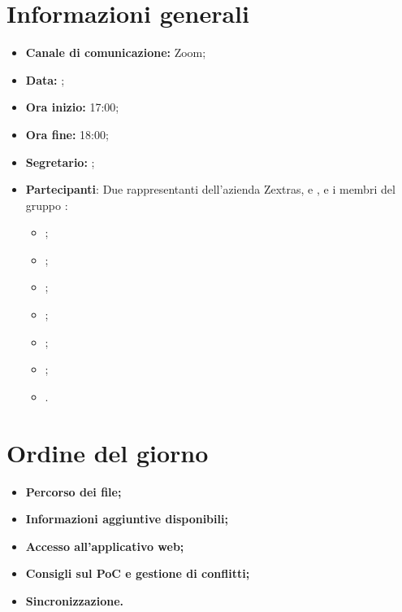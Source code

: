 \section{Informazioni generali}

\begin{itemize}

    \item \textbf{Canale di comunicazione:} Zoom;

    \item \textbf{Data:} \DataMeeting{};
    
    \item \textbf{Ora inizio:} 17:00;

    \item \textbf{Ora fine:} 18:00;

    \item \textbf{Segretario:} \ACapoRedazione{};

    \item \textbf{Partecipanti}: Due rappresentanti dell'azienda Zextras, \Alessio{} e \Federico{}, e i membri del gruppo \Gruppo{}:
    
        \begin{itemize}
            \item \Daniele{};
            \item \Davide{};
            \item \Francesco{};
            \item \Giosue{};
            \item \Lucrezia{};
            \item \Matteo{};
             \item \Tommaso{}.
        \end{itemize}
\end{itemize}

\section{Ordine del giorno}

\begin{itemize}
    \item\textbf{Percorso dei file;}
    \item\textbf{Informazioni aggiuntive disponibili;}
    \item\textbf{Accesso all'applicativo web;}
     \item\textbf{Consigli sul PoC e gestione di conflitti;}
      \item\textbf{Sincronizzazione.}
\end{itemize}
\newpage


